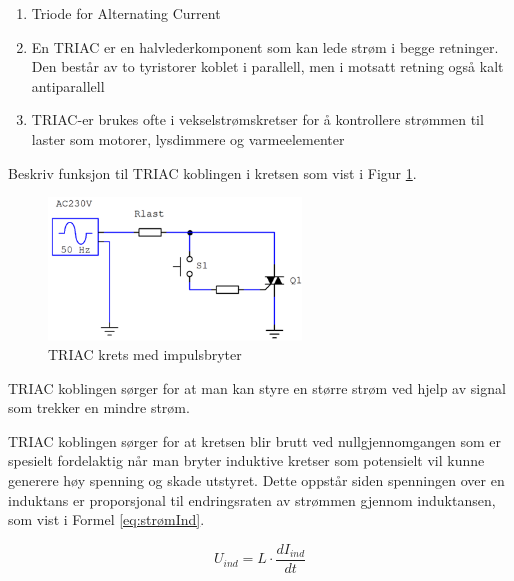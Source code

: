 \begin{solution}[name=Løsningsforslag]


	\begin{enumerate}[label=\roman*)]
	\item Triode for Alternating Current
	\item En TRIAC er en halvlederkomponent som kan lede strøm i begge retninger. Den består av to tyristorer koblet i parallell, men i motsatt retning også kalt antiparallell
	\item TRIAC-er brukes ofte i vekselstrømskretser for å kontrollere strømmen til laster som motorer, lysdimmere og varmeelementer

\end{enumerate}




\end{solution}




\begin{question}[name=Spørsmål, topic=tyristor]
Beskriv funksjon til TRIAC koblingen i kretsen som vist i Figur \ref{fig:triPush}.
\begin{figure}[H]
	\centering
	\includegraphics[width=0.6\textwidth]{tyristor/figurer/tricBasic.png}
	\caption{TRIAC krets med impulsbryter}
	\label{fig:triPush}
\end{figure}
\end{question}

\vspace{0.5cm} %

\begin{solution}[name=Løsningsforslag]
TRIAC koblingen sørger for at man kan styre en større strøm ved hjelp av signal som trekker en mindre strøm.

TRIAC koblingen sørger for at kretsen blir brutt ved nullgjennomgangen som er spesielt fordelaktig når man bryter induktive kretser som potensielt vil kunne generere høy spenning og skade utstyret. Dette oppstår siden spenningen over en induktans er proporsjonal til endringsraten av strømmen gjennom induktansen, som vist i Formel \ref{eq:strømInd}.

\begin{equation}
	\label{eq:strømInd}
	U_{ind}=L \cdot \frac{dI_{ind}}{dt}
\end{equation}

\end{solution}


